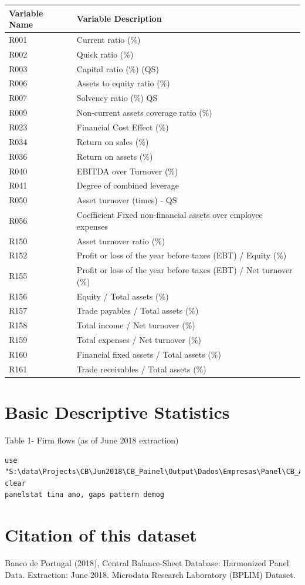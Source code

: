 \documentclass[]{book}
\begin{document}
\begin{longtable}[]{@{}ll@{}}
\toprule
Variable Name & Variable Description\tabularnewline
\midrule
\endhead
R001 & Current ratio (\%)\tabularnewline
R002 & Quick ratio (\%)\tabularnewline
R003 & Capital ratio (\%) (QS)\tabularnewline
R006 & Assets to equity ratio (\%)\tabularnewline
R007 & Solvency ratio (\%) QS\tabularnewline
R009 & Non-current assets coverage ratio (\%)\tabularnewline
R023 & Financial Cost Effect (\%)\tabularnewline
R034 & Return on sales (\%)\tabularnewline
R036 & Return on assets (\%)\tabularnewline
R040 & EBITDA over Turnover (\%)\tabularnewline
R041 & Degree of combined leverage\tabularnewline
R050 & Asset turnover (times) - QS\tabularnewline
R056 & Coefficient Fixed non-financial assets over employee expenses\tabularnewline
R150 & Asset turnover ratio (\%)\tabularnewline
R152 & Profit or loss of the year before taxes (EBT) / Equity (\%)\tabularnewline
R155 & Profit or loss of the year before taxes (EBT) / Net turnover (\%)\tabularnewline
R156 & Equity / Total assets (\%)\tabularnewline
R157 & Trade payables / Total assets (\%)\tabularnewline
R158 & Total income / Net turnover (\%)\tabularnewline
R159 & Total expenses / Net turnover (\%)\tabularnewline
R160 & Financial fixed assets / Total assets (\%)\tabularnewline
R161 & Trade receivables / Total assets (\%)\tabularnewline
\bottomrule
\end{longtable}

\hypertarget{basic-descriptive-statistics}{%
\chapter{Basic Descriptive Statistics}\label{basic-descriptive-statistics}}

Table 1- Firm flows (as of June 2018 extraction)

\begin{verbatim}
use "S:\data\Projects\CB\Jun2018\CB_Painel\Output\Dados\Empresas\Panel\CB_A_FRM_JUN18_ROSTO0616_V01.dta", clear
panelstat tina ano, gaps pattern demog
\end{verbatim}

\hypertarget{citation-of-this-dataset}{%
\chapter{Citation of this dataset}\label{citation-of-this-dataset}}

Banco de Portugal (2018), Central Balance-Sheet Database: Harmonized Panel Data. Extraction: June 2018. Microdata Research Laboratory (BPLIM) Dataset.
\end{document}
